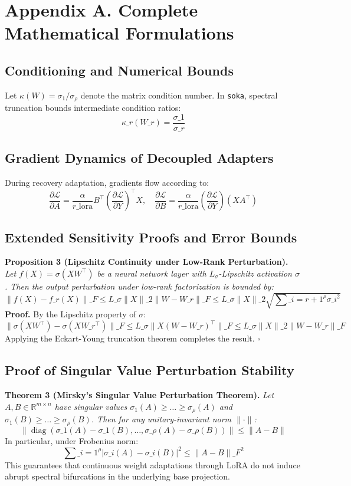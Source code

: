 \section*{Appendix A. Complete Mathematical Formulations}

\subsection*{Conditioning and Numerical Bounds}
Let $\kappa(W) = \sigma_1 / \sigma_\rho$ denote the matrix condition number. In \texttt{soka}, spectral truncation bounds intermediate condition ratios:
\[
\kappa\_r(W\_r) = \frac{\sigma\_1}{\sigma\_r}
\]

\subsection*{Gradient Dynamics of Decoupled Adapters}
During recovery adaptation, gradients flow according to:
\[
\frac{\partial \mathcal{L}}{\partial A} = \frac{\alpha}{r\_{\text{lora}}} B^\top \left( \frac{\partial \mathcal{L}}{\partial Y} \right)^\top X, \quad \frac{\partial \mathcal{L}}{\partial B} = \frac{\alpha}{r\_{\text{lora}}} \left( \frac{\partial \mathcal{L}}{\partial Y} \right) (X A^\top)
\]

\subsection*{Extended Sensitivity Proofs and Error Bounds}
\textbf{Proposition 3 (Lipschitz Continuity under Low-Rank Perturbation).} \textit{Let $f(X) = \sigma(X W^\top)$ be a neural network layer with $L_\sigma$-Lipschitz activation $\sigma$. Then the output perturbation under low-rank factorization is bounded by:}
\[
\|f(X) - f\_r(X)\|\_F \le L\_\sigma \|X\|\_2 \|W - W\_r\|\_F \le L\_\sigma \|X\|\_2 \sqrt{\sum\_{i=r+1}^\rho \sigma\_i^2}
\]
\textbf{Proof.} By the Lipschitz property of $\sigma$:
\[
\|\sigma(X W^\top) - \sigma(X W\_r^\top)\|\_F \le L\_\sigma \|X (W - W\_r)^\top\|\_F \le L\_\sigma \|X\|\_2 \|W - W\_r\|\_F
\]
Applying the Eckart-Young truncation theorem completes the result. $\square$

\subsection*{Proof of Singular Value Perturbation Stability}
\textbf{Theorem 3 (Mirsky's Singular Value Perturbation Theorem).} \textit{Let $A, B \in \mathbb{R}^{m \times n}$ have singular values $\sigma_1(A) \ge \dots \ge \sigma_\rho(A)$ and $\sigma_1(B) \ge \dots \ge \sigma_\rho(B)$. Then for any unitary-invariant norm $\|\cdot\|$:}
\[
\left\| \operatorname{diag}(\sigma\_1(A) - \sigma\_1(B), \dots, \sigma\_\rho(A) - \sigma\_\rho(B)) \right\| \le \|A - B\|
\]
In particular, under Frobenius norm:
\[
\sum\_{i=1}^\rho |\sigma\_i(A) - \sigma\_i(B)|^2 \le \|A - B\|\_F^2
\]
This guarantees that continuous weight adaptations through LoRA do not induce abrupt spectral bifurcations in the underlying base projection.

